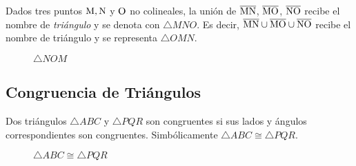 \begin{definition}
    Dados tres puntos $\rm M,N$ y $\rm O$ no colineales, la unión de $\overline{\rm MN}$, $\overline{\rm MO}$, $\overline{\rm NO}$ recibe el nombre de \textit{triángulo} y se denota con $\triangle{MNO}$. Es decir, $\overline{\rm MN} \cup \overline{\rm MO} \cup \overline{\rm NO}$ recibe el nombre de triángulo y se representa $\triangle{OMN}$.

    \begin{figure}[!h]
        \centering
        
        \caption{$\triangle{NOM}$}
        \label{fig:triang}
    \end{figure}
    
\end{definition}

\subsection{Congruencia de Triángulos}

\begin{definition}
    Dos triángulos $\triangle{ABC}$ y $\triangle{PQR}$ son congruentes si sus lados y ángulos correspondientes son congruentes. Simbólicamente $\triangle{ABC} \cong \triangle{PQR}$.

    \begin{figure}[h!]

        \centering

        \begin{subfigure}[b]{.5\textwidth}
            \centering
            
            \label{fig:triang-cong-1}
        \end{subfigure}%
        \begin{subfigure}[b]{.5\textwidth}
            \centering
            
            \label{fig:triang-cong-2}
        \end{subfigure}

        \centering
        \caption{$\triangle{ABC} \cong \triangle{PQR}$}
        \label{fig:triang-cong}
        
    \end{figure}    
    
\end{definition}

